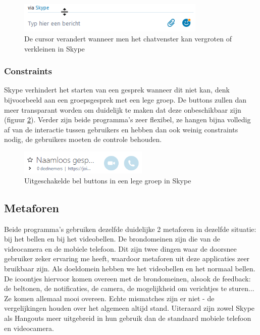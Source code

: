 \documentclass[11pt]{article}
\begin{document}
\begin{figure}
	\centering
	\includegraphics[width=0.8\textwidth]{Niels_SResize.png}
	\caption{De cursor verandert wanneer men het chatvenster kan vergroten of verkleinen in Skype}
	\label{fig:callicons}
\end{figure}
\subsubsection{Constraints}
Skype verhindert het starten van een gesprek wanneer dit niet kan, denk bijvoorbeeld aan een groepsgesprek met een lege groep. De buttons zullen dan meer transparant worden om duidelijk te maken dat deze onbeschikbaar zijn (figuur \ref{fig:skypeconstraint}). Verder zijn beide programma's zeer flexibel, ze hangen bijna volledig af van de interactie tussen gebruikers en hebben dan ook weinig constraints nodig, de gebruikers moeten de controle behouden.
\begin{figure}
	\centering
	\includegraphics[width=0.55\textwidth]{Niels_SConstraint.png}
	\caption{Uitgeschakelde bel buttons in een lege groep in Skype}
	\label{fig:skypeconstraint}
\end{figure}
\newpage
\subsection{Metaforen}
Beide programma's gebruiken dezelfde duidelijke 2 metaforen in dezelfde situatie: bij het bellen en bij het videobellen.
De brondomeinen zijn die van de videocamera en de mobiele telefoon. Dit zijn twee dingen waar de doorsnee gebruiker zeker ervaring me heeft, waardoor metaforen uit deze applicaties zeer bruikbaar zijn.
Als doeldomein hebben we het videobellen en het normaal bellen. De icoontjes hiervoor komen overeen met de brondomeinen, alsook de feedback: de beltonen, de notificaties, de camera, de mogelijkheid om verichtjes te sturen... Ze komen allemaal mooi overeen.
Echte mismatches zijn er niet - de vergelijkingen houden over het algemeen altijd stand. Uiteraard zijn zowel Skype als Hangouts meer uitgebreid in hun gebruik dan de standaard mobiele telefoon en videocamera.
\newpage
\end{document}

